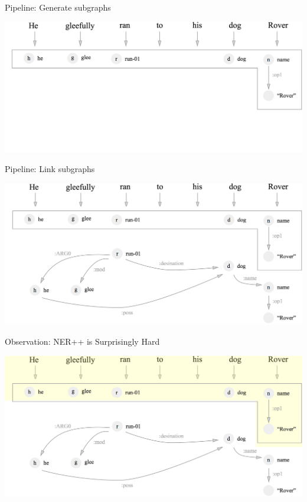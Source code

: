 \documentclass[hyperref]{beamer}
\begin{document}
\begin{frame}[noframenumbering]{Pipeline: Generate subgraphs}
\begin{center}
\includegraphics[scale=0.17]{concept_2.png}
\end{center}
\end{frame}

\begin{frame}[noframenumbering]{Pipeline: Link subgraphs}
\begin{center}
\includegraphics[scale=0.17]{concept_3.png}
\end{center}
\end{frame}


\begin{frame}{Observation: NER++ is Surprisingly Hard}
\begin{center}
\includegraphics[scale=0.17]{concept_hard.png}
\end{center}
\end{frame}
\end{document}
